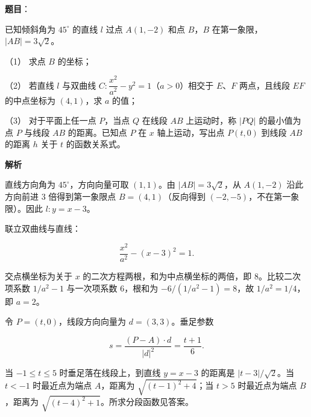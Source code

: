 \begin{answer}

\textbf{题目}：

已知倾斜角为 $45^\circ$ 的直线 $l$ 过点 $A(1,-2)$ 和点 $B$，$B$ 在第一象限，$|AB|=3\sqrt{2}$。

（1） 求点 $B$ 的坐标；

（2） 若直线 $l$ 与双曲线 $C:\dfrac{x^2}{a^2}-y^2=1$（$a>0$）相交于 $E$、$F$ 两点，且线段 $EF$ 的中点坐标为 $(4,1)$，求 $a$ 的值；

（3） 对于平面上任一点 $P$，当点 $Q$ 在线段 $AB$ 上运动时，称 $|PQ|$ 的最小值为点 $P$ 与线段 $AB$ 的距离。已知点 $P$ 在 $x$ 轴上运动，写出点 $P(t,0)$ 到线段 $AB$ 的距离 $h$ 关于 $t$ 的函数关系式。

\textbf{解析}


直线方向角为 $45^\circ$，方向向量可取 $(1,1)$。由 $|AB|=3\sqrt2$，从 $A(1,-2)$ 沿此方向前进 $3$ 倍得到第一象限点 $B=(4,1)$（反向得到 $(-2,-5)$，不在第一象限）。因此 $l:y=x-3$。


联立双曲线与直线：

\nopagebreak[4]
\[\frac{x^2}{a^2}-(x-3)^2=1.\]

交点横坐标为关于 $x$ 的二次方程两根，和为中点横坐标的两倍，即 $8$。比较二次项系数 $1/a^2-1$ 与一次项系数 $6$，根和为 $-6/(1/a^2-1)=8$，故 $1/a^2=1/4$，即 $a=2$。


令 $P=(t,0)$，线段方向向量为 $d=(3,3)$。垂足参数

\nopagebreak[4]
\[s=\frac{(P-A)\cdot d}{|d|^2}=\frac{t+1}{6}.\]

当 $-1\le t\le5$ 时垂足落在线段上，到直线 $y=x-3$ 的距离是 $|t-3|/\sqrt2$。当 $t<-1$ 时最近点为端点 $A$，距离为 $\sqrt{(t-1)^2+4}$；当 $t>5$ 时最近点为端点 $B$，距离为 $\sqrt{(t-4)^2+1}$。所求分段函数见答案。




\end{answer}